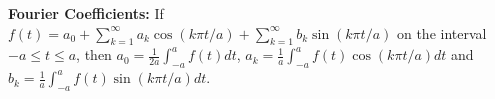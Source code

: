 {\bf Fourier Coefficients:} If $f(t)=a_0+\sum_{k=1}^{\infty}a_k\cos(k\pi t/a)+\sum_{k=1}^{\infty}b_k\sin(k\pi t/a)$ on the interval $-a\leq t\leq a$, then $a_0=\frac{1}{2a}\int_{-a}^{a}f(t)dt$, $a_k=\frac{1}{a}\int_{-a}^{a}f(t)\cos(k\pi t/a)dt$ and $b_k=\frac{1}{a}\int_{-a}^{a}f(t)\sin(k\pi t/a)dt$.